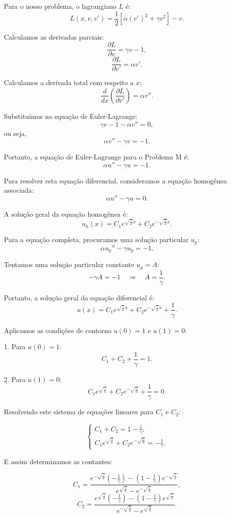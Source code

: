 \documentclass{article}
\begin{document}
Para o nosso problema, o lagrangiano \( L \) é:
\[
L(x, v, v') = \frac{1}{2} \left[ \alpha (v')^2 + \gamma v^2 \right] - v.
\]

Calculamos as derivadas parciais:
\[
\frac{\partial L}{\partial v} = \gamma v - 1,
\]
\[
\frac{\partial L}{\partial v'} = \alpha v'.
\]

Calculamos a derivada total com respeito a \( x \):
\[
\frac{d}{dx} \left( \frac{\partial L}{\partial v'} \right) = \alpha v''.
\]

Substituímos na equação de Euler-Lagrange:
\[
\gamma v - 1 - \alpha v'' = 0,
\]
ou seja,
\[
\alpha v'' - \gamma v = -1.
\]

Portanto, a equação de Euler-Lagrange para o Problema M é:
\[
\alpha u'' - \gamma u = -1.
\]

Para resolver esta equação diferencial, consideramos a equação homogênea associada:
\[
\alpha u'' - \gamma u = 0.
\]

A solução geral da equação homogênea é:
\[
u_h(x) = C_1 e^{\sqrt{\frac{\gamma}{\alpha}} x} + C_2 e^{-\sqrt{\frac{\gamma}{\alpha}} x}.
\]

Para a equação completa, procuramos uma solução particular \( u_p \):
\[
\alpha u_p'' - \gamma u_p = -1.
\]

Tentamos uma solução particular constante \( u_p = A \):
\[
-\gamma A = -1 \quad \Rightarrow \quad A = \frac{1}{\gamma}.
\]

Portanto, a solução geral da equação diferencial é:
\[
u(x) = C_1 e^{\sqrt{\frac{\gamma}{\alpha}} x} + C_2 e^{-\sqrt{\frac{\gamma}{\alpha}} x} + \frac{1}{\gamma}.
\]

Aplicamos as condições de contorno \( u(0) = 1 \) e \( u(1) = 0 \):

1. Para \( u(0) = 1 \):
\[
C_1 + C_2 + \frac{1}{\gamma} = 1.
\]

2. Para \( u(1) = 0 \):
\[
C_1 e^{\sqrt{\frac{\gamma}{\alpha}}} + C_2 e^{-\sqrt{\frac{\gamma}{\alpha}}} + \frac{1}{\gamma} = 0.
\]

Resolvendo este sistema de equações lineares para \( C_1 \) e \( C_2 \):

\[
\begin{cases}
C_1 + C_2 = 1 - \frac{1}{\gamma}, \\
C_1 e^{\sqrt{\frac{\gamma}{\alpha}}} + C_2 e^{-\sqrt{\frac{\gamma}{\alpha}}} = -\frac{1}{\gamma}.
\end{cases}
\]

E assim determinamos as contantes:

\[
C_1 = \frac{e^{-\sqrt{\frac{\gamma}{\alpha}}} \left( -\frac{1}{\gamma} \right) - (1 - \frac{1}{\gamma}) e^{-\sqrt{\frac{\gamma}{\alpha}}}}{e^{\sqrt{\frac{\gamma}{\alpha}}} - e^{-\sqrt{\frac{\gamma}{\alpha}}}},
\]
\[
C_2 = \frac{e^{\sqrt{\frac{\gamma}{\alpha}}} \left( -\frac{1}{\gamma} \right) - (1 - \frac{1}{\gamma}) e^{\sqrt{\frac{\gamma}{\alpha}}}}{e^{-\sqrt{\frac{\gamma}{\alpha}}} - e^{\sqrt{\frac{\gamma}{\alpha}}}}.
\]
\end{document}
